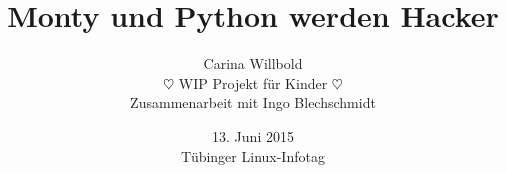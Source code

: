 \documentclass[12pt,ngerman,compress]{beamer}
\title[Python for Kids]{\large Monty und Python werden Hacker}
\author[Carina Willbold]{\small Carina Willbold \\ $\heartsuit$ WIP Projekt für Kinder $\heartsuit$ \\ \vspace*{1 cm}\small{Zusammenarbeit mit Ingo Blechschmidt}}
\institute[Universität Augsburg]{}
\date{%
\vspace{1em} 13. Juni 2015 \\ Tübinger Linux-Infotag \\  }
\begin{document}
\frame{\titlepage}






\end{document}
